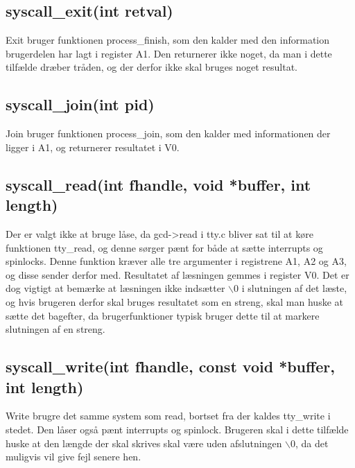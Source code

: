 \documentclass[10pt,a4paper,danish]{article}
\begin{document}
\subsection{syscall\_exit(int retval)}
Exit bruger funktionen process\_finish, som den kalder med den information brugerdelen har lagt i register A1. Den returnerer ikke noget, da man i dette tilfælde dræber tråden, og der derfor ikke skal bruges noget resultat.

\subsection{syscall\_join(int pid)}
Join bruger funktionen process\_join, som den kalder med informationen der ligger i A1, og returnerer resultatet i V0.

\subsection{syscall\_read(int fhandle, void *buffer, int length)}
Der er valgt ikke at bruge låse, da gcd->read i tty.c bliver sat til at køre funktionen tty\_read, og denne sørger pænt for både at sætte interrupts og spinlocks. Denne funktion kræver alle tre argumenter i registrene A1, A2 og A3, og disse sender derfor med. Resultatet af læsningen gemmes i register V0. Det er dog vigtigt at bemærke at læsningen ikke indsætter $\backslash$0 i slutningen af det læste, og hvis brugeren derfor skal bruges resultatet som en streng, skal man huske at sætte det bagefter, da brugerfunktioner typisk bruger dette til at markere slutningen af en streng.

\subsection{syscall\_write(int fhandle, const void *buffer, int length)}
Write brugre det samme system som read, bortset fra der kaldes tty\_write i stedet. Den låser også pænt interrupts og spinlock. Brugeren skal i dette tilfælde huske at den længde der skal skrives skal være uden afslutningen $\backslash$0, da det muligvis vil give fejl senere hen.
\end{document}
